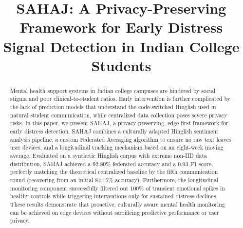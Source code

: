 \documentclass[conference]{IEEEtran}
\begin{document}
\title{SAHAJ: A Privacy-Preserving Framework for Early Distress Signal Detection in Indian College Students}

\author{
\and
{}
\and
{}
\and
{}
}

\maketitle

\begin{abstract}
Mental health support systems in Indian college campuses are hindered by social stigma and poor clinical-to-student ratios. Early intervention is further complicated by the lack of prediction models that understand the code-switched Hinglish used in natural student communication, while centralized data collection poses severe privacy risks. In this paper, we present SAHAJ, a privacy-preserving, edge-first framework for early distress detection. SAHAJ combines a culturally adapted Hinglish sentiment analysis pipeline, a custom Federated Averaging algorithm to ensure no raw text leaves user devices, and a longitudinal tracking mechanism based on an eight-week moving average. Evaluated on a synthetic Hinglish corpus with extreme non-IID data distribution, SAHAJ achieved a 92.80\% federated accuracy and a 0.93 F1 score, perfectly matching the theoretical centralized baseline by the fifth communication round (recovering from an initial 84.15\% accuracy). Furthermore, the longitudinal monitoring component successfully filtered out 100\% of transient emotional spikes in healthy controls while triggering interventions only for sustained distress declines. These results demonstrate that proactive, culturally aware mental health monitoring can be achieved on edge devices without sacrificing predictive performance or user privacy.
\end{abstract}
\end{document}
